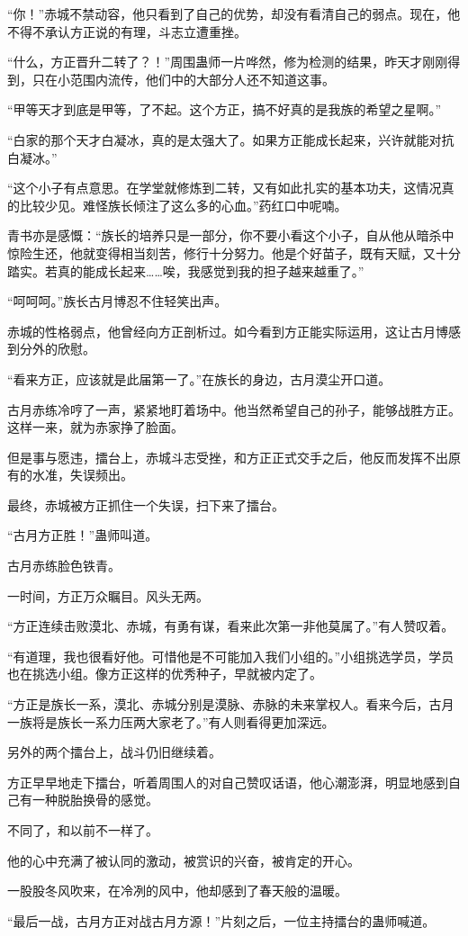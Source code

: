 \begin{this_body}
“你！”赤城不禁动容，他只看到了自己的优势，却没有看清自己的弱点。现在，他不得不承认方正说的有理，斗志立遭重挫。

“什么，方正晋升二转了？！”周围蛊师一片哗然，修为检测的结果，昨天才刚刚得到，只在小范围内流传，他们中的大部分人还不知道这事。

“甲等天才到底是甲等，了不起。这个方正，搞不好真的是我族的希望之星啊。”

“白家的那个天才白凝冰，真的是太强大了。如果方正能成长起来，兴许就能对抗白凝冰。”

“这个小子有点意思。在学堂就修炼到二转，又有如此扎实的基本功夫，这情况真的比较少见。难怪族长倾注了这么多的心血。”药红口中呢喃。

青书亦是感慨：“族长的培养只是一部分，你不要小看这个小子，自从他从暗杀中惊险生还，他就变得相当刻苦，修行十分努力。他是个好苗子，既有天赋，又十分踏实。若真的能成长起来……唉，我感觉到我的担子越来越重了。”

“呵呵呵。”族长古月博忍不住轻笑出声。

赤城的性格弱点，他曾经向方正剖析过。如今看到方正能实际运用，这让古月博感到分外的欣慰。

“看来方正，应该就是此届第一了。”在族长的身边，古月漠尘开口道。

古月赤练冷哼了一声，紧紧地盯着场中。他当然希望自己的孙子，能够战胜方正。这样一来，就为赤家挣了脸面。

但是事与愿违，擂台上，赤城斗志受挫，和方正正式交手之后，他反而发挥不出原有的水准，失误频出。

最终，赤城被方正抓住一个失误，扫下来了擂台。

“古月方正胜！”蛊师叫道。

古月赤练脸色铁青。

一时间，方正万众瞩目。风头无两。

“方正连续击败漠北、赤城，有勇有谋，看来此次第一非他莫属了。”有人赞叹着。

“有道理，我也很看好他。可惜他是不可能加入我们小组的。”小组挑选学员，学员也在挑选小组。像方正这样的优秀种子，早就被内定了。

“方正是族长一系，漠北、赤城分别是漠脉、赤脉的未来掌权人。看来今后，古月一族将是族长一系力压两大家老了。”有人则看得更加深远。

另外的两个擂台上，战斗仍旧继续着。

方正早早地走下擂台，听着周围人的对自己赞叹话语，他心潮澎湃，明显地感到自己有一种脱胎换骨的感觉。

不同了，和以前不一样了。

他的心中充满了被认同的激动，被赏识的兴奋，被肯定的开心。

一股股冬风吹来，在冷冽的风中，他却感到了春天般的温暖。

“最后一战，古月方正对战古月方源！”片刻之后，一位主持擂台的蛊师喊道。

\end{this_body}

